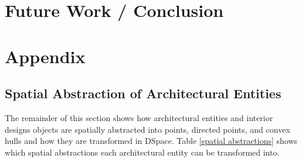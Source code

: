 \documentclass[12pt]{ucthesis}
\begin{document}





\chapter{Future Work / Conclusion}

\appendix
\chapter{Appendix}
\section{Spatial Abstraction of Architectural Entities} \label{spatial abstraction}
The remainder of this section shows how architectural entities and interior designs objects are spatially abstracted into points, directed points, and convex hulls and how they are transformed in DSpace. Table \ref{spatial abstractions} shows which spatial abstractions each architectural entity can be transformed into. 
\end{document}
